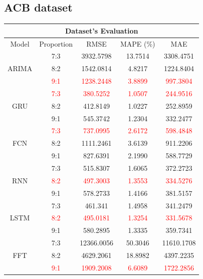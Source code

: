 \documentclass{ieeeojies}
\begin{document}
\subsection{ACB dataset} 
\begin{table}[H]
    \centering
    \begin{tabular}{|c|c|c|c|c|}
         \hline
         \multicolumn{5}{|c|}{\textbf{Dataset's Evaluation}}\\
         \hline
         \centering Model & Proportion & RMSE & MAPE (\%) & MAE\\
\hline
\multirow{3}{*}{\centering ARIMA} & 7:3 & 3932.5798 & 13.7514 & 3308.4751 \\
     & 8:2 & 1542.0814 & 4.8217 & 1224.8404 \\
     & \textcolor{red}{9:1} & \textcolor{red}{1238.2448} & \textcolor{red}{3.8899} & \textcolor{red}{997.3804} \\
\hline
\multirow{3}{*}{\centering GRU}   & \textcolor{red}{7:3} & \textcolor{red}{380.5252} & \textcolor{red}{1.0507} & \textcolor{red}{244.9516} \\
     & 8:2 & 412.8149 & 1.0227 & 252.8959 \\
     & 9:1 & 545.3742 & 1.2304 & 332.2477 \\
\hline
\multirow{3}{*}{\centering FCN}   & \textcolor{red}{7:3} & \textcolor{red}{737.0995} & \textcolor{red}{2.6172} & \textcolor{red}{598.4848} \\
     & 8:2 & 1111.2461 & 3.6139 & 911.2206 \\
     & 9:1 & 827.6391 & 2.1990 & 588.7729 \\
\hline
\multirow{3}{*}{\centering RNN}   & 7:3 & 515.8307 & 1.6065 & 372.2723 \\
     & \textcolor{red}{8:2} & \textcolor{red}{497.3003} & \textcolor{red}{1.3553} & \textcolor{red}{334.5276} \\
     & 9:1 & 578.2733 & 1.4166 & 381.5157 \\
\hline
\multirow{3}{*}{\centering LSTM}  & 7:3 & 461.341 & 1.4958 & 341.2479 \\
     & \textcolor{red}{8:2} & \textcolor{red}{495.0181} & \textcolor{red}{1.3254} & \textcolor{red}{331.5678} \\
     & 9:1 & 580.2895 & 1.3335 & 359.7341 \\
\hline
\multirow{3}{*}{\centering FFT}   & 7:3 & 12366.0056 & 50.3046 & 11610.1708 \\
     & 8:2 & 4629.2061 & 18.8982 & 4397.2235 \\
     & \textcolor{red}{9:1} & \textcolor{red}{1909.2008} & \textcolor{red}{6.6089} & \textcolor{red}{1722.2856} \\

\end{tabular}
\end{table}
\end{document}
